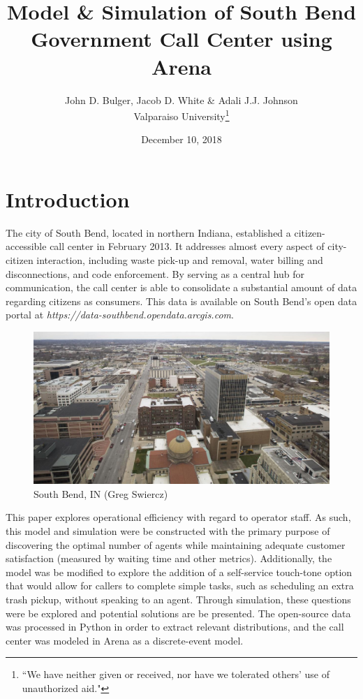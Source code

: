 \documentclass[12pt,twocolumn]{article}
\title{Model \& Simulation of South Bend Government Call Center using Arena}
\author{John D. Bulger, Jacob D. White \& Adali J.J. Johnson\\Valparaiso University\thanks{``We have neither given or received, nor have we tolerated others' use of unauthorized aid."}}
\date{December 10, 2018}
\begin{document}
\maketitle

\section{Introduction}
The city of South Bend, located in northern Indiana, established a citizen-accessible call center in February 2013.  It addresses almost every aspect of city-citizen interaction, including waste pick-up and removal, water billing and disconnections, and code enforcement.  By serving as a central hub for communication, the call center is able to consolidate a substantial amount of data regarding citizens as consumers.  This data is available on South Bend's open data portal at \textit{https://data-southbend.opendata.arcgis.com}.

	\begin{figure}[h]
	\includegraphics[scale=.17]{south_bend.png}
	\caption{South Bend, IN (Greg Swiercz)}
	\end{figure}

\par
This paper explores operational efficiency with regard to operator staff.  As such, this model and simulation were be constructed with the primary purpose of discovering the optimal number of agents while maintaining adequate customer satisfaction (measured by waiting time and other metrics).  Additionally, the model was be modified to explore the addition of a self-service touch-tone option that would allow for callers to complete simple tasks, such as scheduling an extra trash pickup, without speaking to an agent.  Through simulation, these questions were be explored and potential solutions are be presented.  The open-source data was processed in Python in order to extract relevant distributions, and the call center was modeled in Arena as a discrete-event model.  
\end{document}
